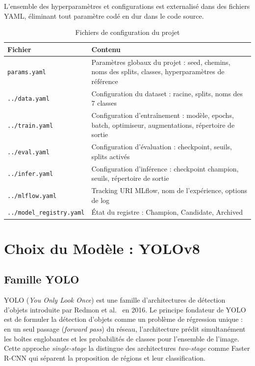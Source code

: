 \documentclass{rapportENSIAS}
\begin{document}
L'ensemble des hyperparamètres et configurations est externalisé dans des
fichiers YAML, éliminant tout paramètre codé en dur dans le code source.

\begin{table}[H]
\centering
\caption{Fichiers de configuration du projet}
\label{tab:configs}
\begin{tabular}{p{4.5cm} p{9.5cm}}
\toprule
\textbf{Fichier} & \textbf{Contenu} \\
\midrule
\texttt{params.yaml}
  & Paramètres globaux du projet : seed, chemins, noms des splits,
    classes, hyperparamètres de référence \\
\texttt{../data.yaml}
  & Configuration du dataset : racine, splits, noms des 7 classes \\
\texttt{../train.yaml}
  & Configuration d'entraînement : modèle, epochs, batch, optimiseur,
    augmentations, répertoire de sortie \\
\texttt{../eval.yaml}
  & Configuration d'évaluation : checkpoint, seuils, splits activés \\
\texttt{../infer.yaml}
  & Configuration d'inférence : checkpoint champion, seuils, répertoire de sortie \\
\texttt{../mlflow.yaml}
  & Tracking URI MLflow, nom de l'expérience, options de log \\
\texttt{../model\_registry.yaml}
  & État du registre : Champion, Candidate, Archived \\
\bottomrule
\end{tabular}
\end{table}

\section{Choix du Modèle : YOLOv8}

\subsection{Famille YOLO}

YOLO (\textit{You Only Look Once}) est une famille d'architectures de détection
d'objets introduite par Redmon et al.~\cite{redmon2016yolo} en 2016. Le principe
fondateur de YOLO est de formuler la détection d'objets comme un problème de
régression unique : en un seul passage (\textit{forward pass}) du réseau,
l'architecture prédit simultanément les boîtes englobantes et les probabilités
de classes pour l'ensemble de l'image. Cette approche \textit{single-stage}
la distingue des architectures \textit{two-stage} comme Faster R-CNN qui
séparent la proposition de régions et leur classification.
\end{document}
